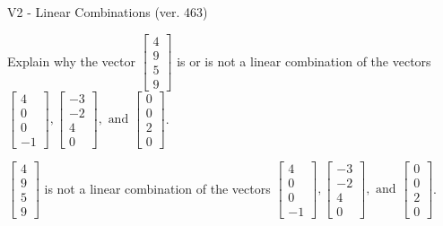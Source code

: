 \begin{exercise}
  \begin{exerciseTitle}V2 - Linear Combinations (ver. 463)\end{exerciseTitle}
  \begin{exerciseStatement}
    Explain why the vector \(\left[\begin{array}{c}
4 \\
9 \\
5 \\
9
\end{array}\right]\)  is or is not a linear 
	combination of the vectors \(\left[\begin{array}{c}
4 \\
0 \\
0 \\
-1
\end{array}\right] , \left[\begin{array}{c}
-3 \\
-2 \\
4 \\
0
\end{array}\right] , \text{ and } \left[\begin{array}{c}
0 \\
0 \\
2 \\
0
\end{array}\right]\).
	


  \end{exerciseStatement}
  \begin{exerciseAnswer}
   \(\left[\begin{array}{c}
4 \\
9 \\
5 \\
9
\end{array}\right]\) 
  	 is not  
	a linear combination of the vectors \(\left[\begin{array}{c}
4 \\
0 \\
0 \\
-1
\end{array}\right] , \left[\begin{array}{c}
-3 \\
-2 \\
4 \\
0
\end{array}\right] , \text{ and } \left[\begin{array}{c}
0 \\
0 \\
2 \\
0
\end{array}\right]\).

	
  


  \end{exerciseAnswer}
\end{exercise}